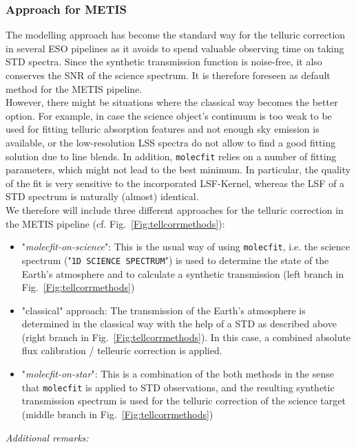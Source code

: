 \subsubsection{Approach for METIS}
The modelling approach has become the standard way for the telluric correction in several ESO pipelines as it avoids to spend valuable observing time on taking \ac{STD} spectra. Since the synthetic transmission function is noise-free, it also conserves the \ac{SNR} of the science spectrum. It is therefore  foreseen as default method for the \ac{METIS} pipeline.\\
However, there might be situations where the classical way becomes the better option. For example, in case the science object's continuum is too weak to be used for fitting telluric absorption features and not enough sky emission is available, or the low-resolution \ac{LSS} spectra do not allow to find a good fitting solution due to line blends. In addition, \texttt{molecfit} relies on a number of fitting parameters, which might not lead to the best minimum. In particular, the quality of the fit is very sensitive to the incorporated \ac{LSF}-Kernel, whereas the \ac{LSF} of a \ac{STD} spectrum is naturally (almost) identical.\\
We therefore will include three different approaches for the telluric correction in the \ac{METIS} pipeline (cf. Fig.~\ref{Fig:tellcorrmethods}):
\begin{itemize}
    \item "\textit{molecfit-on-science}": This is the usual way of using \texttt{molecfit}, i.e. the science spectrum ("\texttt{1D SCIENCE SPECTRUM}") is used to determine the state of the Earth's atmosphere and to calculate a synthetic transmission (left branch in Fig.~\ref{Fig:tellcorrmethods})
    \item "classical" approach: The transmission of the Earth's atmosphere is determined in the classical way with the help of a \ac{STD} as described above (right branch in Fig.~\ref{Fig:tellcorrmethods}). In this case, a combined absolute flux calibration / telleuric correction is applied.
    \item "\textit{molecfit-on-star}": This is a combination of the both methods in the sense that \texttt{molecfit} is applied to \ac{STD} observations, and the resulting synthetic transmission spectrum is used for the telluric correction of the science target  (middle branch in Fig.~\ref{Fig:tellcorrmethods})
\end{itemize}
\textit{Additional remarks:}\\
